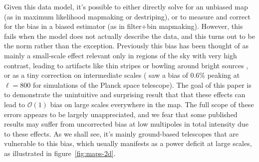 \documentclass{aa}
\begin{document}
Given this data model, it's possible to either directly solve for
an unbiased map (as in maximum likelihood mapmaking or destriping),
or to measure and correct for the bias in a biased estimator
(as in filter+bin mapmaking). However, this fails when the model
does not actually describe the data, and this turns out to be
the norm rather than the exception. Previously this bias has
been thought of as mainly a small-scale effect relevant only in
regions of the sky with very high contrast, leading to artifacts
like thin stripes or bowling around bright sources \citep{xgls-2017,model-error},
or as a tiny correction on intermediate scales (\citet{planck-ml-bias-2006}
saw a bias of 0.6\% peaking at $\ell=800$ for simulations of the Planck
space telescope). The goal of this paper is to
demonstrate the unintuitive and surprising result that that these effects
can lead to $\mathcal{O}(1)$ bias on large scales everywhere
in the map. The full scope of these errors appears to be largely
unappreciated, and we fear that some published results
may suffer from uncorrected bias at low multipoles in total intensity
due to these effects. As we shall see, it's mainly ground-based telescopes
that are vulnerable to this bias, which usually manifests as a power
deficit at large scales, as illustrated in figure~\ref{fig:maps-2d}.
\end{document}
